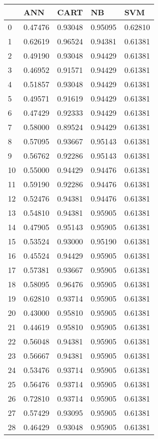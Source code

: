 \begin{tabular}{|l|l|l|l|l|}
\toprule
{} &      ANN &     CART &       NB &      SVM \\
\midrule
0  &  0.47476 &  0.93048 &  0.95095 &  0.62810 \\
1  &  0.62619 &  0.96524 &  0.94381 &  0.61381 \\
2  &  0.49190 &  0.93048 &  0.94429 &  0.61381 \\
3  &  0.46952 &  0.91571 &  0.94429 &  0.61381 \\
4  &  0.51857 &  0.93048 &  0.94429 &  0.61381 \\
5  &  0.49571 &  0.91619 &  0.94429 &  0.61381 \\
6  &  0.47429 &  0.92333 &  0.94429 &  0.61381 \\
7  &  0.58000 &  0.89524 &  0.94429 &  0.61381 \\
8  &  0.57095 &  0.93667 &  0.95143 &  0.61381 \\
9  &  0.56762 &  0.92286 &  0.95143 &  0.61381 \\
10 &  0.55000 &  0.94429 &  0.94476 &  0.61381 \\
11 &  0.59190 &  0.92286 &  0.94476 &  0.61381 \\
12 &  0.52476 &  0.94381 &  0.94476 &  0.61381 \\
13 &  0.54810 &  0.94381 &  0.95905 &  0.61381 \\
14 &  0.47905 &  0.95143 &  0.95905 &  0.61381 \\
15 &  0.53524 &  0.93000 &  0.95190 &  0.61381 \\
16 &  0.45524 &  0.94429 &  0.95905 &  0.61381 \\
17 &  0.57381 &  0.93667 &  0.95905 &  0.61381 \\
18 &  0.58095 &  0.96476 &  0.95905 &  0.61381 \\
19 &  0.62810 &  0.93714 &  0.95905 &  0.61381 \\
20 &  0.43000 &  0.95810 &  0.95905 &  0.61381 \\
21 &  0.44619 &  0.95810 &  0.95905 &  0.61381 \\
22 &  0.56048 &  0.94381 &  0.95905 &  0.61381 \\
23 &  0.56667 &  0.94381 &  0.95905 &  0.61381 \\
24 &  0.53476 &  0.93714 &  0.95905 &  0.61381 \\
25 &  0.56476 &  0.93714 &  0.95905 &  0.61381 \\
26 &  0.72810 &  0.93714 &  0.95905 &  0.61381 \\
27 &  0.57429 &  0.93095 &  0.95905 &  0.61381 \\
28 &  0.46429 &  0.93048 &  0.95905 &  0.61381 \\
\bottomrule
\end{tabular}
